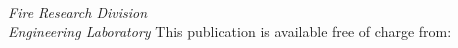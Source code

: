 \begin{titlepage}
\begin{flushright}
\LARGE{}\\
\LARGE{\sffamily{\textbf{\pubnumber}}}\\
\vfill
\Huge{\sffamily{\textbf{\pubtitle}}}\\
\Large{\sffamily{\textit{\pubsubtitle}}}\\
\vfill
\normalsize \authorone\\
\authortwo\\
\textit{Fire Research Division}\\
\textit{Engineering Laboratory}
\vfill
\normalsize This publication is available free of charge from:\\
\DOI\\
\vfill
\normalsize \pubmonth~\pubyear\\
\vfill


\end{flushright}
\end{titlepage}
